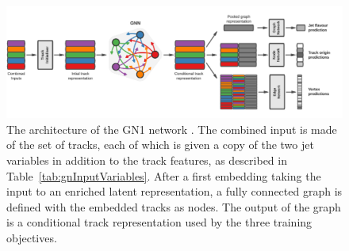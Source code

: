 \begin{figure}[h!]
  \center
  \hspace{-1.6cm}
  \includegraphics[width=1.1\textwidth]{Images/FTAG/GN/Intro/gnn_architecture.png}
  \caption{The architecture of the GN1 network \cite{ATL-PHYS-PUB-2022-027}. The combined input is made of the set of tracks, each of which is given a copy of the two jet variables in addition to the track features, as described in Table~\ref{tab:gnInputVariables}. After a first embedding taking the input to an enriched latent representation, a fully connected graph is defined with the embedded tracks as nodes. The output of the graph is a conditional track representation used by the three training objectives.} 
  \label{fig:gnnArchitecture}
\end{figure}

